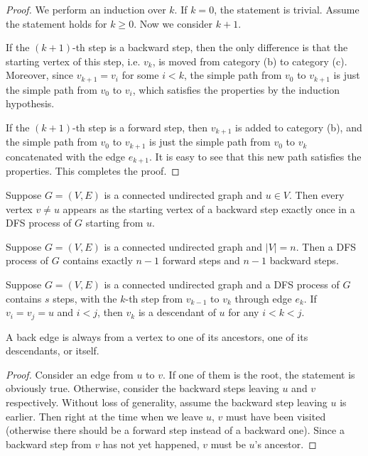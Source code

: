 \begin{proof}
    We perform an induction over $k$. If $k=0$, the statement is trivial. Assume the statement holds for $k\geq 0$. Now we consider $k+1$. 
    
    If the $(k+1)$-th step is a backward step, then the only difference is that the starting vertex of this step, i.e. $v_k$, is moved from category (b) to category (c). Moreover, since $v_{k+1}=v_i$ for some $i<k$, the simple path from $v_0$ to $v_{k+1}$ is just the simple path from $v_0$ to $v_i$, which satisfies the properties by the induction hypothesis. 
    
    If the $(k+1)$-th step is a forward step, then $v_{k+1}$ is added to category (b), and the simple path from $v_0$ to $v_{k+1}$ is just the simple path from $v_0$ to $v_k$ concatenated with the edge $e_{k+1}$. It is easy to see that this new path satisfies the properties. This completes the proof. 
\end{proof}

\begin{corollary}
    Suppose $G=(V,E)$ is a connected undirected graph and $u\in V$. Then every vertex $v\neq u$ appears as the starting vertex of a backward step exactly once in a DFS process of $G$ starting from $u$.
\end{corollary}

\begin{corollary}
    Suppose $G=(V,E)$ is a connected undirected graph and $|V|=n$. Then a DFS process of $G$ contains exactly $n-1$ forward steps and $n-1$ backward steps.
\end{corollary}

\begin{corollary}
    Suppose $G=(V,E)$ is a connected undirected graph and a DFS process of $G$ contains $s$ steps, with the $k$-th step from $v_{k-1}$ to $v_k$ through edge $e_k$. If $v_i=v_j=u$ and $i<j$, then $v_k$ is a descendant of $u$ for any $i<k<j$.
\end{corollary}

\begin{theorem}
    A back edge is always from a vertex to one of its ancestors, one of its descendants, or itself.
\end{theorem}

\begin{proof}
    Consider an edge from $u$ to $v$. If one of them is the root, the statement is obviously true. Otherwise, consider the backward steps leaving $u$ and $v$ respectively. Without loss of generality, assume the backward step leaving $u$ is earlier. Then right at the time when we leave $u$, $v$ must have been visited (otherwise there should be a forward step instead of a backward one). Since a backward step from $v$ has not yet happened, $v$ must be $u$'s ancestor. 
\end{proof}

